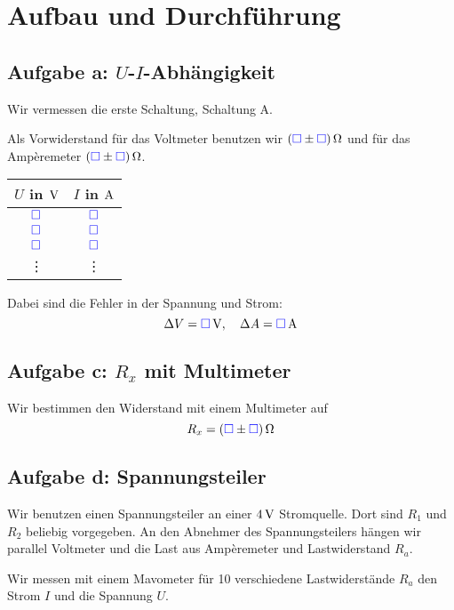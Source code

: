 \documentclass[11pt,german]{article}
\newcommand{\messwert}{\textcolor{blue}{\square}}
\begin{document}
\section{Aufbau und Durchführung}

\subsection{Aufgabe a: $U$-$I$-Abhängigkeit}

Wir vermessen die erste Schaltung, Schaltung A.

Als Vorwiderstand für das Voltmeter benutzen wir $\unit[(\messwert \pm
\messwert)] \Omega$ und für das Ampèremeter $\unit[(\messwert \pm \messwert)]
\Omega$.

\begin{center}
	\begin{tabular}{cc}
		$U$ in $\unit V$ & $I$ in $\unit A$ \\
		\hline
		$\messwert$ & $\messwert$ \\
		$\messwert$ & $\messwert$ \\
		$\messwert$ & $\messwert$ \\
			 \vdots & \vdots
	\end{tabular}
\end{center}

Dabei sind die Fehler in der Spannung und Strom:
\[ \Delta V = \unit[\messwert]V, \quad \Delta A = \unit[\messwert] A \]

\subsection{Aufgabe c: $R_x$ mit Multimeter}

Wir bestimmen den Widerstand mit einem Multimeter auf
\[ R_x = \unit[(\messwert \pm \messwert)]{\Omega} \]

\subsection{Aufgabe d: Spannungsteiler}

\label{durchführung-d}

Wir benutzen einen Spannungsteiler an einer $\unit[4]V$ Stromquelle. Dort sind
$R_1$ und $R_2$ beliebig vorgegeben. An den Abnehmer des Spannungsteilers
hängen wir parallel Voltmeter und die Last aus Ampèremeter und Lastwiderstand
$R_a$.

Wir messen mit einem Mavometer für 10 verschiedene Lastwiderstände $R_a$ den
Strom $I$ und die Spannung $U$.
\end{document}

